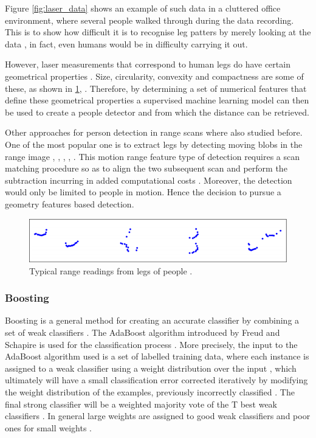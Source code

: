 Figure \ref{figːlaser_data} shows an example of such data in a cluttered office environment, where several people walked through during the data recording. This is to show how difficult it is to recognise leg patters by merely looking at the data \cite{arras2007using}, in fact, even humans would be in difficulty carrying it out.

However, laser measurements that correspond to human legs do have certain geometrical properties \cite{arras2007using}. Size, circularity, convexity and compactness are some of these, as shown in \ref{figːleg_scans}, \cite{arras2007using}. Therefore, by determining a set of numerical features that define these geometrical properties a supervised machine learning model can then be used to create a people detector \cite{arras2007using} and from which the distance can be retrieved.

Other approaches for person detection in range scans where also studied before. One of the most popular one is to extract legs by detecting moving blobs in the range image \cite{fod2002laser}, \cite{kleinehagenbrock2002person}, \cite{scheutz2004fast}, \cite{schulz2003people}, \cite{arras2007using}. This motion range feature type of detection requires a scan matching procedure so as to align the two subsequent scan and perform the subtraction incurring in added computational costs \cite{arras2007using}. Moreover, the detection would only be limited to people in motion. Hence the decision to pursue a geometry features based detection.

\begin{figure}[H]
\begin{center}
\includegraphics[width=.4\linewidth]{images/leg_scans.png}
\end{center}
\caption{Typical range readings from legs of people \cite{arras2007using}.}
\label{figːleg_scans}
\end{figure}


\subsubsection{Boosting}

Boosting is a general method for creating an accurate classifier by combining a set of weak classifiers \cite{arras2007using}. The AdaBoost algorithm introduced by Freud and Schapire \cite{schapire1999improved} is used for the classification process \cite{arras2007using}. More precisely, the input to the AdaBoost algorithm used is a set of labelled training data, where each instance is assigned to a weak classifier using a weight distribution over the input \cite{arras2007using}, which ultimately will have a small classification error corrected iteratively by modifying the weight distribution of the examples, previously incorrectly classified \cite{arras2007using}. The final strong classifier will be a weighted majority vote of the T best weak classifiers \cite{arras2007using}. In general large weights are assigned to good weak classifiers and poor ones for small weights \cite{arras2007using}.

